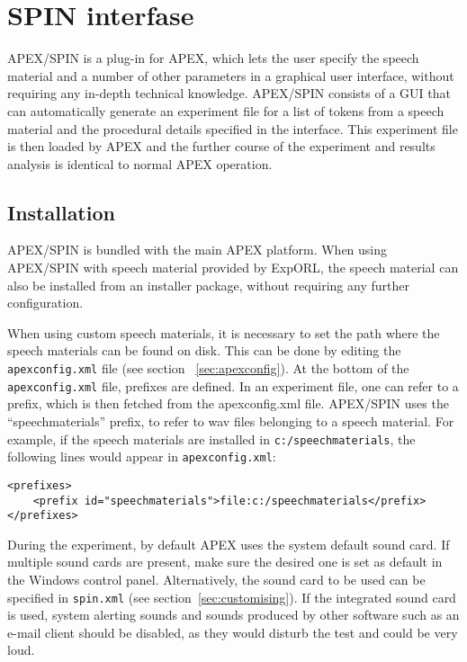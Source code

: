 \chapter{SPIN interfase}
\label{chap:SPIN}

APEX/SPIN is a plug-in for APEX, which lets the user specify the speech material and a number
of other parameters in a graphical user interface, without
requiring any in-depth technical knowledge. APEX/SPIN
consists of a GUI that can automatically generate an experiment file for
a list of tokens from a speech material and the procedural details
specified in the interface. This experiment file is then loaded by APEX
and the further course of the experiment and results analysis is
identical to normal APEX operation.

\section{Installation}
\label{sec:Installation}

APEX/SPIN is bundled with the main APEX platform. When using APEX/SPIN
with speech material provided by ExpORL, the speech material can also
be installed from an installer package, without requiring any further
configuration.

When using custom speech materials, it is necessary to set the path
where the speech materials can be found on disk. This can be done by
editing the \texttt{apexconfig.xml} file (see section ~\ref{sec:apexconfig}).
At the bottom of the \texttt{apexconfig.xml} file, prefixes are defined.
In an experiment file, one can refer to a prefix, which is then fetched
from the apexconfig.xml file. APEX/SPIN uses the ``speechmaterials''
prefix, to refer to wav files belonging to a speech material. For example, if
the speech materials are installed in \texttt{c:/speechmaterials}, the
following lines would appear in \texttt{apexconfig.xml}:

\begin{lstlisting}[caption=Specifying a prefix]
<prefixes>
    <prefix id="speechmaterials">file:c:/speechmaterials</prefix>
</prefixes>
\end{lstlisting}

During the experiment, by default APEX uses the system default sound
card. If multiple sound cards are present, make sure the desired one is
set as default in the Windows control panel. Alternatively, the sound
card to be used can be specified in \texttt{spin.xml} (see
section~\ref{sec:customising}). If the integrated sound card is used,
system alerting sounds and sounds produced by other software such as an
e-mail client should be disabled, as they would disturb the test and
could be very loud.

